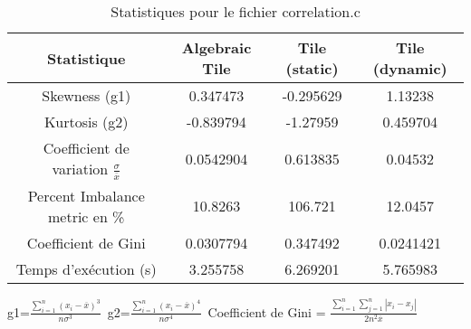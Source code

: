 \documentclass{article}
\begin{document}
\begin{table}[htbp]
  \centering
  \caption{Statistiques pour le fichier correlation.c}
  \begin{tabular}{|c|c|c|c|}
    \hline
    Statistique & Algebraic Tile & Tile (static) & Tile (dynamic) \\ 
    \hline
    Skewness (g1)  & 0.347473 & -0.295629 & 1.13238 \\ 
    Kurtosis (g2)  & -0.839794 & -1.27959 & 0.459704 \\ 
    Coefficient de variation $ \frac{\sigma}{\overline{x}} $ & 0.0542904 & 0.613835 & 0.04532\\ 
    Percent Imbalance metric en \% & 10.8263 & 106.721 & 12.0457\\ 
    Coefficient de Gini  & 0.0307794 & 0.347492 & 0.0241421\\ 
    Temps d'exécution (s) &  3.255758    &  6.269201   &  5.765983   \\ 

    \hline
  \end{tabular}
\end{table}
g1=$ \frac{\sum_{i=1}^{n} (x_i - \overline{x})^3}{n\sigma^3} $\
g2=$ \frac{\sum_{i=1}^{n} (x_i - \overline{x})^4}{n\sigma^4} $\
Coefficient de Gini = $ \frac{\sum_{i=1}^{n}\sum_{j=1}^{n} |x_i - x_j|}{2n^2\overline{x}} $\
\newpage
\end{document}

